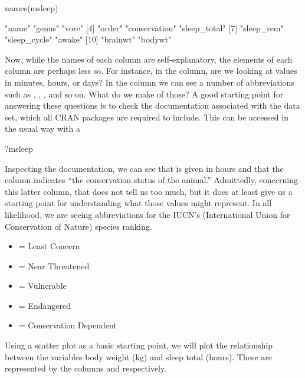\begin{inR}
names(msleep)
\end{inR}
\begin{outR}
 [1] "name"         "genus"        "vore"        
 [4] "order"        "conservation" "sleep_total" 
 [7] "sleep_rem"    "sleep_cycle"  "awake"       
[10] "brainwt"      "bodywt"   
\end{outR}

Now, while the names of each column are self-explanatory, the elements of each column are perhaps less so.  For instance, in the  column, are we looking at values in minutes, hours, or days? In the  column we can see a number of abbreviations such as , , , and so on. What do we make of those? A good starting point for answering these questions is to check the documentation associated with the data set, which all CRAN packages are required to include. This can be accessed in the usual way with a 

\begin{inR}
?msleep
\end{inR}
\vspace{1em}

\noindent
Inspecting the documentation, we can see that  is given in hours and that the column  indicates ``the conservation status of the animal.''  Admittedly, concerning this latter column, that does not tell us too much, but it does at least give us a starting point for understanding what those values might represent.  In all likelihood, we are seeing abbreviations for the IUCN's (International Union for Conservation of Nature) species ranking. 

\begin{itemize}
\setlength\itemsep{-1em}
    \item {} = Least Concern
    \item {} = Near Threatened
    \item {} = Vulnerable
    \item {} = Endangered
    \item {} = Conservation Dependent
\end{itemize}

Using a \gls{scatter plot} as a basic starting point, we will plot the relationship between the variables body weight (kg) and sleep total (hours).  These are represented by the columns  and  respectively. 

